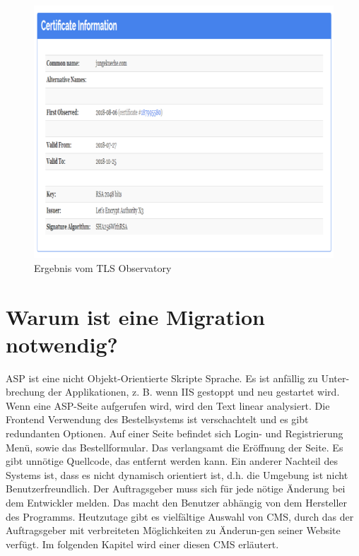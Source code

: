 \begin{figure}[h]
	\centering
	\includegraphics[width=0.6\linewidth]{Graphics/obser2.png}
	\caption[Egebniss TSL Observatory]{Ergebnis vom TLS Observatory}
	\label{fig: TSL Observatory: Ergebnis}
\end{figure}

\section{Warum ist eine Migration notwendig?}

ASP ist eine nicht Objekt-Orientierte Skripte Sprache. Es ist anfällig zu Unter-brechung der Applikationen, z. B. wenn \ac{IIS} gestoppt und neu gestartet wird. Wenn eine ASP-Seite aufgerufen wird, wird den Text linear analysiert.
Die Frontend Verwendung des Bestellsystems ist verschachtelt und es gibt redundanten Optionen. Auf einer Seite befindet sich Login- und Registrierung Menü, sowie das Bestellformular. Das verlangsamt die Eröffnung der Seite. 
Es gibt unnötige Quellcode, das entfernt werden kann. Ein anderer Nachteil des Systems ist, dass es nicht dynamisch orientiert ist, d.h. die Umgebung ist nicht Benutzerfreundlich. Der Auftragsgeber muss sich für jede nötige Änderung bei dem Entwickler melden. Das macht den Benutzer abhängig von dem Hersteller des Programms.
Heutzutage gibt es vielfältige Auswahl von CMS, durch das der Auftragsgeber mit verbreiteten Möglichkeiten zu Änderun-gen seiner Website verfügt. 
Im folgenden Kapitel wird einer diesen CMS erläutert.





